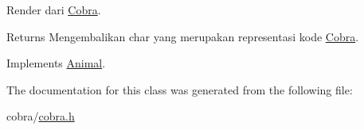 Render dari \hyperlink{classCobra}{Cobra}. 

\begin{DoxyReturn}{Returns}
Mengembalikan char yang merupakan representasi kode \hyperlink{classCobra}{Cobra}. 
\end{DoxyReturn}


Implements \hyperlink{classAnimal_a43a47c0f41d211128e04abc6add53def}{Animal}.



The documentation for this class was generated from the following file\+:\begin{DoxyCompactItemize}
\item 
cobra/\hyperlink{cobra_8h}{cobra.\+h}\end{DoxyCompactItemize}
